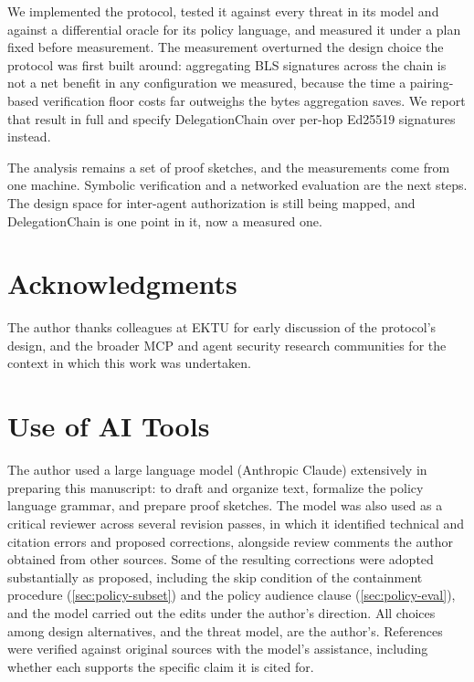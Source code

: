 \documentclass[11pt,a4paper]{article}
\begin{document}
We implemented the protocol, tested it against every threat in its model
and against a differential oracle for its policy language, and measured
it under a plan fixed before measurement. The measurement overturned the
design choice the protocol was first built around: aggregating BLS
signatures across the chain is not a net benefit in any configuration we
measured, because the time a pairing-based verification floor costs
far outweighs the bytes aggregation saves. We report that result in full and specify
DelegationChain over per-hop Ed25519 signatures instead.

The analysis remains a set of proof sketches, and the measurements come
from one machine. Symbolic verification and a networked evaluation are
the next steps. The design space for inter-agent authorization is still
being mapped, and DelegationChain is one point in it, now a measured
one.

\section*{Acknowledgments}
\label{sec:acknowledgments}

The author thanks colleagues at EKTU for early
discussion of the protocol's design, and the broader MCP and agent
security research communities for the context in which this work
was undertaken.

\section*{Use of AI Tools}
\label{sec:ai-tools}

The author used a large language model (Anthropic Claude) extensively in
preparing this manuscript: to draft and organize text, formalize the
policy language grammar, and prepare proof sketches. The model was also
used as a critical reviewer across several revision passes, in which it
identified technical and citation errors and proposed corrections,
alongside review comments the author obtained from other sources. Some
of the resulting corrections were adopted substantially as proposed,
including the skip condition of the containment procedure
(\cref{sec:policy-subset}) and the policy audience clause
(\cref{sec:policy-eval}), and the model carried out the edits under the
author's direction. All choices among design alternatives, and the
threat model, are the author's. References were verified against
original sources with the model's assistance, including whether each
supports the specific claim it is cited for.
\end{document}
